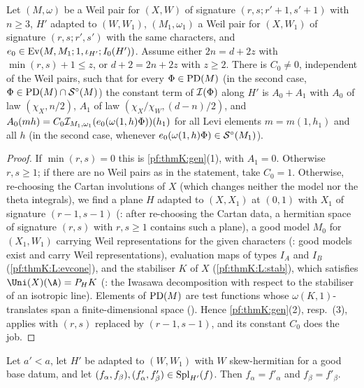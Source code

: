 \begin{lemma}\label{pf:thmK:evalpart}
Let $(M,\omega)$ be a Weil pair for $(X,W)$ of signature $(r,s;r'+1,s'+1)$ with $n\ge3$, $H'$ adapted to $(W,W_1)$, $(M_1,
\omega_1)$ a Weil pair for $(X,W_1)$ of signature $(r,s;r',s')$ with the same characters, and
$e_0\in\operatorname{Ev}(M,M_1;1,\iota_{H'};I_0(H'))$. Assume either $2n=d+2z$ with $\min(r,s)+1\le z$, or $d+2=2n+2z$ with $z\ge2$.
There is $C_0\ne0$, independent of the Weil pairs, such that for every $\Phi\in\operatorname{PD}(M)$ (in the second case,
$\Phi\in\operatorname{PD}(M)\cap\mathcal{S}^{\circ}(M)$) the constant term of $\mathcal{I}(\Phi)$ along $H'$ is $A_0+A_1$ with $A_0$ of law
$(\chi_X,n/2)$, $A_1$ of law $(\chi_X/\chi_W,(d-n)/2)$, and $A_0(mh)=C_0\mathcal{I}_{M_1,\omega_1}(e_0(\omega(1,h)\Phi))(h_1)$ for
all Levi elements $m=m(1,h_1)$ and all $h$ (in the second case, whenever $e_0(\omega(1,h)\Phi)\in\mathcal{S}^{\circ}(M_1)$).
\end{lemma}

\begin{proof}
If $\min(r,s)=0$ this is \cref{pf:thmK:gen}(1), with $A_1=0$. Otherwise $r,s\ge1$; if there are no Weil pairs as in the
statement, take $C_0=1$. Otherwise, re-choosing the Cartan involutions of $X$ (which changes neither the model nor the
theta integrals), we find a plane $H$ adapted to $(X,X_1)$ at $(0,1)$ with $X_1$ of signature $(r-1,s-1)$
(: after re-choosing the Cartan data, a hermitian space of signature $(r,s)$
with $r,s\ge1$ contains such a plane), a good model $M_0$ for $(X_1,W_1)$ carrying Weil representations for the given
characters (: good models exist and carry Weil representations), evaluation
maps of types $I_A$ and $I_B$ (\ref{pf:thmK:L:evcone}), and the stabiliser $K$ of $X$ (\ref{pf:thmK:L:stab}), which satisfies
$\Uni(X)(\A)=P_HK$ (: the Iwasawa decomposition with respect to the stabiliser of
an isotropic line). Elements of $\operatorname{PD}(M)$ are test functions whose $\omega(K,1)$-translates span a finite-dimensional
space (). Hence \cref{pf:thmK:gen}(2), resp.\ (3), applies with
$(r,s)$ replaced by $(r-1,s-1)$, and its constant $C_0$ does the job.
\end{proof}

\begin{lemma}\label{pf:thmK:splituniq}
Let $a'<a$, let $H'$ be adapted to $(W,W_1)$ with $W$ skew-hermitian for a good base datum, and let
$(f_\alpha,f_\beta),(f'_\alpha,f'_\beta)\in\operatorname{Spl}_{H'}(f)$. Then $f_\alpha=f'_\alpha$ and $f_\beta=f'_\beta$.
\end{lemma}

